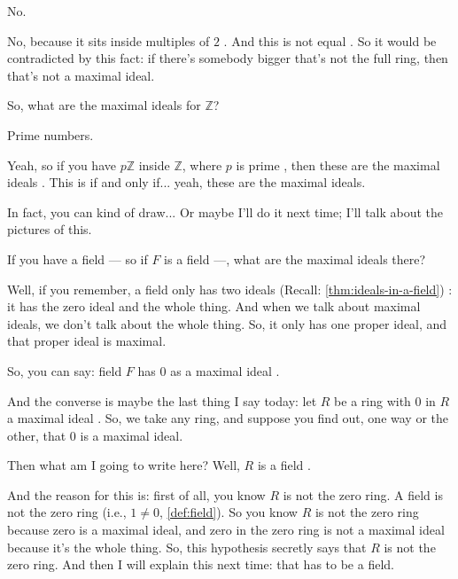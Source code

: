 \begin{student}
No.
\end{student}

\begin{speech}[00:40:57 - 00:41:18]
No, because it sits inside multiples of $2$ . And this is not equal . So it would be contradicted by this fact: if there's somebody bigger that's not the full ring, then that's not a maximal ideal.

So, what are the maximal ideals for $\mathbb{Z}$?
\end{speech}

\begin{student}
Prime numbers.
\end{student}

\begin{speech}[00:41:21 - 00:43:42]
Yeah, so if you have $p\mathbb{Z}$ inside $\mathbb{Z}$, where $p$ is prime , then these are the maximal ideals . This is if and only if... yeah, these are the maximal ideals.

In fact, you can kind of draw... Or maybe I'll do it next time; I'll talk about the pictures of this.

If you have a field --- so if $F$ is a field  ---, what are the maximal ideals there?

Well, if you remember, a field only has two ideals (Recall: \cref{thm:ideals-in-a-field}) : it has the zero ideal and the whole thing. And when we talk about maximal ideals, we don't talk about the whole thing. So, it only has one proper ideal, and that proper ideal is maximal.

So, you can say: field $F$ has $0$ as a maximal ideal .

And the converse is maybe the last thing I say today: let $R$ be a ring  with $0$ in $R$ a maximal ideal . So, we take any ring, and suppose you find out, one way or the other, that $0$ is a maximal ideal.

Then what am I going to write here? Well, $R$ is a field .

And the reason for this is: first of all, you know $R$ is not the zero ring. A field is not the zero ring (i.e., $1 \neq 0$, \cref{def:field}). So you know $R$ is not the zero ring because zero is a maximal ideal, and zero in the zero ring is not a maximal ideal because it's the whole thing. So, this hypothesis secretly says that $R$ is not the zero ring. And then I will explain this next time: that has to be a field. 
\end{speech}

